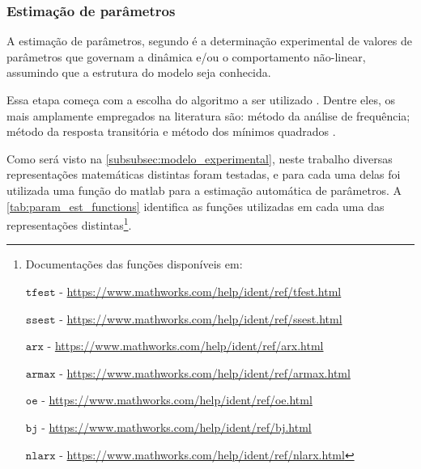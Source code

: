 \subsubsection{Estimação de parâmetros}
\label{subsubsec:estimacao_de_parametros}

A estimação de parâmetros, segundo  é a determinação experimental
de valores de parâmetros que governam a dinâmica e/ou o comportamento não-linear, assumindo que a
estrutura do modelo seja conhecida.

Essa etapa começa com a escolha do algoritmo a ser utilizado \cite{Aguirre2015}. Dentre eles, os
mais amplamente empregados na literatura são: método da análise de frequência; método da resposta
transitória e método dos mínimos quadrados \cite{Favaro2012}.

Como será visto na \cref{subsubsec:modelo_experimental}, neste trabalho diversas representações matemáticas
distintas foram testadas, e para cada uma delas foi utilizada uma função do \acrshort{matlab} para 
a estimação automática de parâmetros. A \cref{tab:param_est_functions} identifica as funções
utilizadas em cada uma das representações distintas\footnote{
    Documentações das funções disponíveis em:

    $\mathtt{tfest}$ - \url{https://www.mathworks.com/help/ident/ref/tfest.html}

    $\mathtt{ssest}$ - \url{https://www.mathworks.com/help/ident/ref/ssest.html}

    $\mathtt{arx}$ - \url{https://www.mathworks.com/help/ident/ref/arx.html}

    $\mathtt{armax}$ - \url{https://www.mathworks.com/help/ident/ref/armax.html}

    $\mathtt{oe}$ - \url{https://www.mathworks.com/help/ident/ref/oe.html}

    $\mathtt{bj}$ - \url{https://www.mathworks.com/help/ident/ref/bj.html}

    $\mathtt{nlarx}$ - \url{https://www.mathworks.com/help/ident/ref/nlarx.html}
}.

